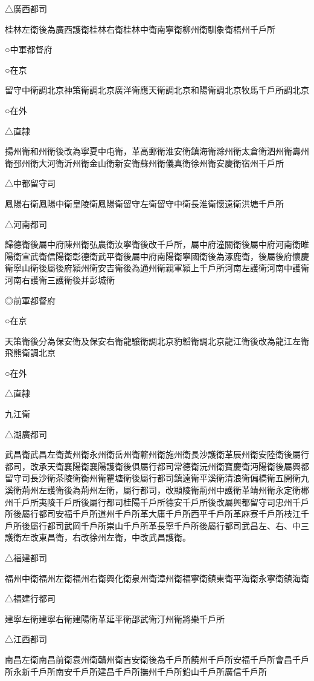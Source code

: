 △廣西都司

桂林左衛後為廣西護衛桂林右衛桂林中衛南寧衛柳州衛馴象衛梧州千戶所

○中軍都督府

○在京

留守中衛調北京神策衛調北京廣洋衛應天衛調北京和陽衛調北京牧馬千戶所調北京

○在外

△直隸

揚州衛和州衛後改為寧夏中屯衛，革高郵衛淮安衛鎮海衛滁州衛太倉衛泗州衛壽州衛邳州衛大河衛沂州衛金山衛新安衛蘇州衛儀真衛徐州衛安慶衛宿州千戶所

△中都留守司

鳳陽右衛鳳陽中衛皇陵衛鳳陽衛留守左衛留守中衛長淮衛懷遠衛洪塘千戶所

△河南都司

歸德衛後屬中府陳州衛弘農衛汝寧衛後改千戶所，屬中府潼關衛後屬中府河南衛睢陽衛宣武衛信陽衛彰德衛武平衛後屬中府南陽衛寧國衛後為涿鹿衛，後屬後府懷慶衛寧山衛後屬後府潁州衛安吉衛後為通州衛親軍潁上千戶所河南左護衛河南中護衛河南右護衛三護衛後并彭城衛

◎前軍都督府

○在京

天策衛後分為保安衛及保安右衛龍驤衛調北京豹韜衛調北京龍江衛後改為龍江左衛飛熊衛調北京

○在外

△直隸

九江衛

△湖廣都司

武昌衛武昌左衛黃州衛永州衛岳州衛蘄州衛施州衛長沙護衛革辰州衛安陸衛後屬行都司，改承天衛襄陽衛襄陽護衛後俱屬行都司常德衛沅州衛寶慶衛沔陽衛後屬興都留守司長沙衛茶陵衛衡州衛瞿塘衛後屬行都司鎮遠衛平溪衛清浪衛偏橋衛五開衛九溪衛荊州左護衛後為荊州左衛，屬行都司，改顯陵衛荊州中護衛革靖州衛永定衛郴州千戶所夷陵千戶所後屬行都司桂陽千戶所德安千戶所後改屬興都留守司忠州千戶所後屬行都司安福千戶所道州千戶所革大庸千戶所西平千戶所革麻寮千戶所枝江千戶所後屬行都司武岡千戶所崇山千戶所革長寧千戶所後屬行都司武昌左、右、中三護衛左改東昌衛，右改徐州左衛，中改武昌護衛。

△福建都司

福州中衛福州左衛福州右衛興化衛泉州衛漳州衛福寧衛鎮東衛平海衛永寧衛鎮海衛

△福建行都司

建寧左衛建寧右衛建陽衛革延平衛邵武衛汀州衛將樂千戶所

△江西都司

南昌左衛南昌前衛袁州衛贛州衛吉安衛後為千戶所饒州千戶所安福千戶所會昌千戶所永新千戶所南安千戶所建昌千戶所撫州千戶所鉛山千戶所廣信千戶所

